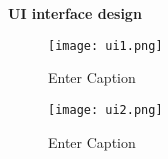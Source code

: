 \documentclass{scrartcl}
\begin{document}



\newpage
\appendix


\textbf{UI interface design }
\begin{figure}[H]
    \centering
    \texttt{[image: ui1.png]}
    \caption{Enter Caption}
    \label{fig:enter-label}
\end{figure}

\begin{figure}[H]
    \centering
    \texttt{[image: ui2.png]}
    \caption{Enter Caption}
    \label{fig:enter-label}
\end{figure}
\end{document}

